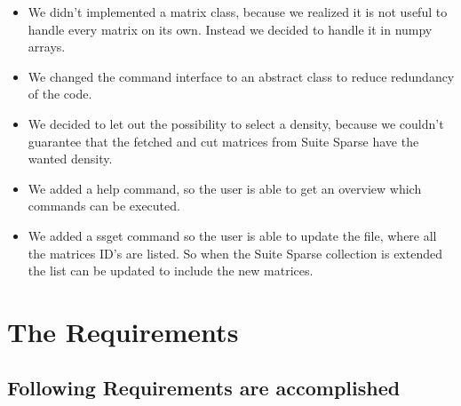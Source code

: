 \documentclass[parskip=full]{scrartcl}
\begin{document}
\begin{itemize}

\item We didn't implemented a matrix class, because we realized it is not useful to handle every matrix on its own. 
Instead we decided to handle it in numpy arrays.

\item We changed the command interface to an abstract class to reduce redundancy of the code.

\item We decided to let out the possibility to select a density, because we couldn't guarantee that the fetched and cut matrices from \gls{Suite Sparse} have the wanted density.

\item We added a help command, so the user is able to get an overview which commands can be executed.

\item We added a \gls{ssget} command so the user is able to update the file, where all the matrices ID's are listed.
So when the \gls{Suite Sparse} collection is extended the list can be updated to include the new matrices. 

\end{itemize}



\section{The Requirements}
\subsection{Following Requirements are accomplished}
\end{document}
